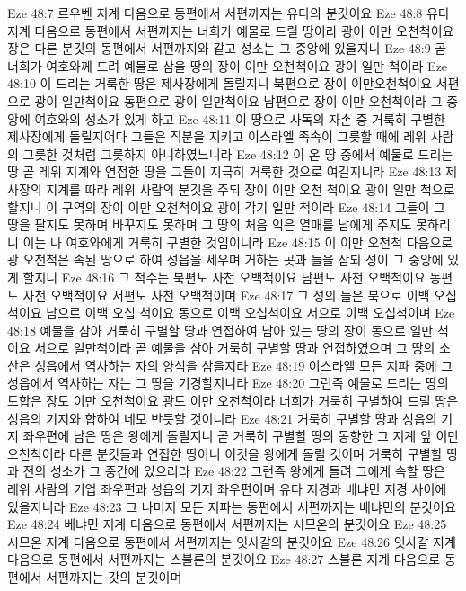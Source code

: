 Eze 48:7  르우벤 지계 다음으로 동편에서 서편까지는 유다의 분깃이요
Eze 48:8  유다 지계 다음으로 동편에서 서편까지는 너희가 예물로 드릴 땅이라 광이 이만 오천척이요 장은 다른 분깃의 동편에서 서편까지와 같고 성소는 그 중앙에 있을지니
Eze 48:9  곧 너희가 여호와께 드려 예물로 삼을 땅의 장이 이만 오천척이요 광이 일만 척이라
Eze 48:10  이 드리는 거룩한 땅은 제사장에게 돌릴지니 북편으로 장이 이만오천척이요 서편으로 광이 일만척이요 동편으로 광이 일만척이요 남편으로 장이 이만 오천척이라 그 중앙에 여호와의 성소가 있게 하고
Eze 48:11  이 땅으로 사독의 자손 중 거룩히 구별한 제사장에게 돌릴지어다 그들은 직분을 지키고 이스라엘 족속이 그릇할 때에 레위 사람의 그릇한 것처럼 그릇하지 아니하였느니라
Eze 48:12  이 온 땅 중에서 예물로 드리는 땅 곧 레위 지계와 연접한 땅을 그들이 지극히 거룩한 것으로 여길지니라
Eze 48:13  제사장의 지계를 따라 레위 사람의 분깃을 주되 장이 이만 오천 척이요 광이 일만 척으로 할지니 이 구역의 장이 이만 오천척이요 광이 각기 일만 척이라
Eze 48:14  그들이 그 땅을 팔지도 못하며 바꾸지도 못하며 그 땅의 처음 익은 열매를 남에게 주지도 못하리니 이는 나 여호와에게 거룩히 구별한 것임이니라
Eze 48:15  이 이만 오천척 다음으로 광 오천척은 속된 땅으로 하여 성읍을 세우며 거하는 곳과 들을 삼되 성이 그 중앙에 있게 할지니
Eze 48:16  그 척수는 북편도 사천 오백척이요 남편도 사천 오백척이요 동편도 사천 오백척이요 서편도 사천 오백척이며
Eze 48:17  그 성의 들은 북으로 이백 오십 척이요 남으로 이백 오십 척이요 동으로 이백 오십척이요 서으로 이백 오십척이며
Eze 48:18  예물을 삼아 거룩히 구별할 땅과 연접하여 남아 있는 땅의 장이 동으로 일만 척이요 서으로 일만척이라 곧 예물을 삼아 거룩히 구별할 땅과 연접하였으며 그 땅의 소산은 성읍에서 역사하는 자의 양식을 삼을지라
Eze 48:19  이스라엘 모든 지파 중에 그 성읍에서 역사하는 자는 그 땅을 기경할지니라
Eze 48:20  그런즉 예물로 드리는 땅의 도합은 장도 이만 오천척이요 광도 이만 오천척이라 너희가 거룩히 구별하여 드릴 땅은 성읍의 기지와 합하여 네모 반듯할 것이니라
Eze 48:21  거룩히 구별할 땅과 성읍의 기지 좌우편에 남은 땅은 왕에게 돌릴지니 곧 거룩히 구별할 땅의 동향한 그 지계 앞 이만 오천척이라 다른 분깃들과 연접한 땅이니 이것을 왕에게 돌릴 것이며 거룩히 구별할 땅과 전의 성소가 그 중간에 있으리라
Eze 48:22  그런즉 왕에게 돌려 그에게 속할 땅은 레위 사람의 기업 좌우편과 성읍의 기지 좌우편이며 유다 지경과 베냐민 지경 사이에 있을지니라
Eze 48:23  그 나머지 모든 지파는 동편에서 서편까지는 베냐민의 분깃이요
Eze 48:24  베냐민 지계 다음으로 동편에서 서편까지는 시므온의 분깃이요
Eze 48:25  시므온 지계 다음으로 동편에서 서편까지는 잇사갈의 분깃이요
Eze 48:26  잇사갈 지계 다음으로 동편에서 서편까지는 스불론의 분깃이요
Eze 48:27  스불론 지계 다음으로 동편에서 서편까지는 갓의 분깃이며
